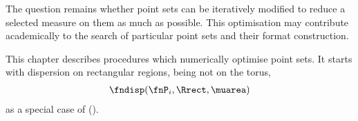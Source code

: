 %
The question remains whether point sets can be iteratively modified to reduce a selected measure on them as much as possible. This optimisation may contribute academically to the search of particular point sets and their format construction.

This chapter describes procedures which numerically optimise point sets. It starts with dispersion on rectangular regions, being not on the torus,
\begin{align*}
  \fndisp(\fnP_i, \Rrect, \muarea)
\end{align*}
as a special case of ().

\clearpage
